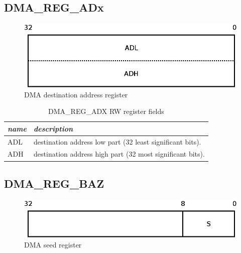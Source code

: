 \documentclass[a4paper, 11pt]{article}
\begin{document}
\newpage
\subsection{DMA\_REG\_ADx}

\begin{figure}[!h]
\begin{center}
\includegraphics[scale=0.20]{../pic/dma_reg_adx/main.jpeg}
\end{center}
\caption{\tiny{DMA destination address register}}
\label{dma_reg_adx}
\end{figure}

\begin{table}[!h]
\centering
\begin{scriptsize}
\begin{tabular}{|p{1cm}|p{12cm}|}
  \hline
  \textit{name} & \textit{description} \\
  \hline
  ADL
  &
  destination address low part (32 least significant bits). \\
  \hline
  ADH
  &
  destination address high part (32 most significant bits). \\
  \hline
\end{tabular}
\end{scriptsize}
\caption{\tiny{DMA\_REG\_ADX RW register fields}}
\label{tab:dma_reg_adx_fields}
\end{table}

\newpage
\subsection{DMA\_REG\_BAZ}

\begin{figure}[!h]
\begin{center}
\includegraphics[scale=0.20]{../pic/dma_reg_baz/main.jpeg}
\end{center}
\caption{\tiny{DMA seed register}}
\label{dma_reg_baz}
\end{figure}
\end{document}
